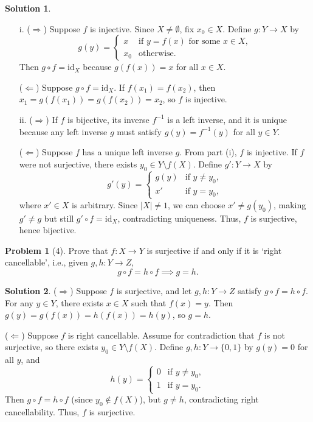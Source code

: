 \documentclass{article}
\theoremstyle{definition}
\newtheorem{problem}{Problem}
\newtheorem{solution}{Solution}
\begin{document}
\begin{solution}
\begin{enumerate}
    \item[i.] ($\Rightarrow$) Suppose $f$ is injective. Since $X \neq \emptyset$, fix $x_0 \in X$. Define $g : Y \longrightarrow X$ by
    \[
    g(y) = 
    \begin{cases}
    x & \text{if } y = f(x) \text{ for some } x \in X, \\
    x_0 & \text{otherwise}.
    \end{cases}
    \]
    Then $g \circ f = \text{id}_X$ because $g(f(x)) = x$ for all $x \in X$.

    ($\Leftarrow$) Suppose $g \circ f = \text{id}_X$. If $f(x_1) = f(x_2)$, then $x_1 = g(f(x_1)) = g(f(x_2)) = x_2$, so $f$ is injective.

    \item[ii.] ($\Rightarrow$) If $f$ is bijective, its inverse $f^{-1}$ is a left inverse, and it is unique because any left inverse $g$ must satisfy $g(y) = f^{-1}(y)$ for all $y \in Y$.

    ($\Leftarrow$) Suppose $f$ has a unique left inverse $g$. From part (i), $f$ is injective. If $f$ were not surjective, there exists $y_0 \in Y \setminus f(X)$. Define $g' : Y \longrightarrow X$ by
    \[
    g'(y) = 
    \begin{cases}
    g(y) & \text{if } y \neq y_0, \\
    x' & \text{if } y = y_0,
    \end{cases}
    \]
    where $x' \in X$ is arbitrary. Since $|X| \neq 1$, we can choose $x' \neq g(y_0)$, making $g' \neq g$ but still $g' \circ f = \text{id}_X$, contradicting uniqueness. Thus, $f$ is surjective, hence bijective.
\end{enumerate}
\end{solution}

\begin{problem}[4]
Prove that $f : X \longrightarrow Y$ is surjective if and only if it is ‘right cancellable’, i.e., given $g, h : Y \longrightarrow Z$,
\[ g \circ f = h \circ f \implies g = h. \]
\end{problem}

\begin{solution}
($\Rightarrow$) Suppose $f$ is surjective, and let $g, h : Y \longrightarrow Z$ satisfy $g \circ f = h \circ f$. For any $y \in Y$, there exists $x \in X$ such that $f(x) = y$. Then $g(y) = g(f(x)) = h(f(x)) = h(y)$, so $g = h$.

($\Leftarrow$) Suppose $f$ is right cancellable. Assume for contradiction that $f$ is not surjective, so there exists $y_0 \in Y \setminus f(X)$. Define $g, h : Y \longrightarrow \{0, 1\}$ by $g(y) = 0$ for all $y$, and
\[
h(y) = 
\begin{cases}
0 & \text{if } y \neq y_0, \\
1 & \text{if } y = y_0.
\end{cases}
\]
Then $g \circ f = h \circ f$ (since $y_0 \notin f(X)$), but $g \neq h$, contradicting right cancellability. Thus, $f$ is surjective.
\end{solution}
\end{document}
